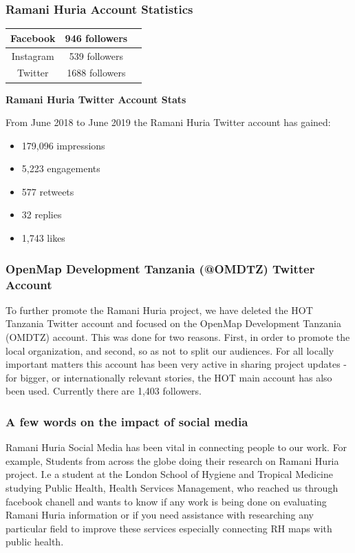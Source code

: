 \documentclass[a4paper,12pt,twoside]{article}
\begin{document}
\subsubsection{Ramani Huria Account Statistics}
\begin{center}

\begin{tabular}{|c|c|c|}
\hline
Facebook & 946 followers\\
\hline
Instagram & 539 followers\\
\hline
Twitter & 1688 followers\\
\hline
\end{tabular}
\end{center}

\textbf{Ramani Huria Twitter Account Stats} 

From June 2018 to June 2019 the Ramani Huria Twitter account has gained:
\begin{itemize}
    \item 179,096 impressions
    \item 5,223 engagements
    \item 577 retweets
    \item 32 replies
    \item 1,743 likes
\end{itemize}

\subsubsection{OpenMap Development Tanzania (@OMDTZ) Twitter Account}  
To further promote the Ramani Huria project,  we have deleted the HOT Tanzania Twitter account and focused on the OpenMap Development Tanzania (OMDTZ) account. This was done for two reasons. First, in order to promote the local organization, and second, so as not to split our audiences. For all locally important matters this account has been very active in sharing project updates - for bigger, or internationally relevant stories, the HOT main account has also been used. Currently there are 1,403 followers. 


\subsubsection{A few words on the impact of social media}
Ramani Huria Social Media has been vital in connecting people to our work. For example, Students from across the globe doing their research on Ramani Huria project. I.e a student at the London School of Hygiene and Tropical Medicine studying Public Health, Health Services Management, who reached us through facebook chanell and wants to know if any work is being done on evaluating Ramani Huria information or if you need assistance with researching any particular field to improve these services especially connecting RH maps with public health.
\end{document}
